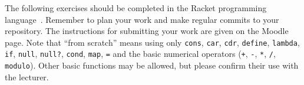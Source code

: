 \documentclass[a4paper, 12pt]{exam}
\begin{document}
\noindent
The following exercises should be completed in the Racket programming language~\cite{racketwebsite}.
Remember to plan your work and make regular commits to your repository.
The instructions for submitting your work are given on the Moodle page.
Note that ``from scratch'' means using only \texttt{cons}, \texttt{car}, \texttt{cdr}, \texttt{define}, \texttt{lambda}, \texttt{if}, \texttt{null}, \texttt{null?}, \texttt{cond}, \texttt{map}, \texttt{=} and the basic numerical operators (\texttt{+}, \texttt{-}, \texttt{*}, \texttt{/}, \texttt{modulo}).
Other basic functions may be allowed, but please confirm their use with the lecturer.
\end{document}

